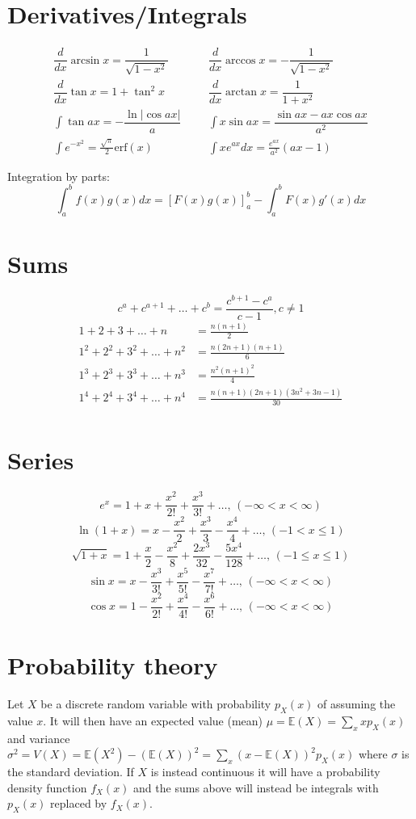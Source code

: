 \section{Derivatives/Integrals}
\begin{align*}
	\dfrac{d}{dx}\arcsin x = \dfrac{1}{\sqrt{1-x^2}} &&& \dfrac{d}{dx}\arccos x = -\dfrac{1}{\sqrt{1-x^2}} \\
	\dfrac{d}{dx}\tan x = 1+\tan^2 x &&& \dfrac{d}{dx}\arctan x = \dfrac{1}{1+x^2} \\
	\int\tan ax = -\dfrac{\ln|\cos ax|}{a} &&& \int x\sin ax = \dfrac{\sin ax-ax \cos ax}{a^2} \\
	\int e^{-x^2} = \frac{\sqrt \pi}{2} \text{erf}(x) &&& \int xe^{ax}dx = \frac{e^{ax}}{a^2}(ax-1)
\end{align*}

Integration by parts:
\[\int_a^bf(x)g(x)dx = [F(x)g(x)]_a^b-\int_a^bF(x)g'(x)dx\]

\section{Sums}
\[ c^a + c^{a+1} + \dots + c^{b} = \frac{c^{b+1} - c^a}{c-1}, c \neq 1 \]
\begin{align*}
	1 + 2 + 3 + \dots + n &= \frac{n(n+1)}{2} \\
	1^2 + 2^2 + 3^2 + \dots + n^2 &= \frac{n(2n+1)(n+1)}{6} \\
	1^3 + 2^3 + 3^3 + \dots + n^3 &= \frac{n^2(n+1)^2}{4} \\
	1^4 + 2^4 + 3^4 + \dots + n^4 &= \frac{n(n+1)(2n+1)(3n^2 + 3n - 1)}{30} \\
\end{align*}

\section{Series}
$$e^x = 1+x+\frac{x^2}{2!}+\frac{x^3}{3!}+\dots,\,(-\infty<x<\infty)$$
$$\ln(1+x) = x-\frac{x^2}{2}+\frac{x^3}{3}-\frac{x^4}{4}+\dots,\,(-1<x\leq1)$$
$$\sqrt{1+x} = 1+\frac{x}{2}-\frac{x^2}{8}+\frac{2x^3}{32}-\frac{5x^4}{128}+\dots,\,(-1\leq x\leq1)$$
$$\sin x = x-\frac{x^3}{3!}+\frac{x^5}{5!}-\frac{x^7}{7!}+\dots,\,(-\infty<x<\infty)$$
$$\cos x = 1-\frac{x^2}{2!}+\frac{x^4}{4!}-\frac{x^6}{6!}+\dots,\,(-\infty<x<\infty)$$

\section{Probability theory}
Let $X$ be a discrete random variable with probability $p_X(x)$ of assuming the value $x$. It will then have an expected value (mean) $\mu=\mathbb{E}(X)=\sum_xxp_X(x)$ and variance $\sigma^2=V(X)=\mathbb{E}(X^2)-(\mathbb{E}(X))^2=\sum_x(x-\mathbb{E}(X))^2p_X(x)$ where $\sigma$ is the standard deviation. If $X$ is instead continuous it will have a probability density function $f_X(x)$ and the sums above will instead be integrals with $p_X(x)$ replaced by $f_X(x)$.

